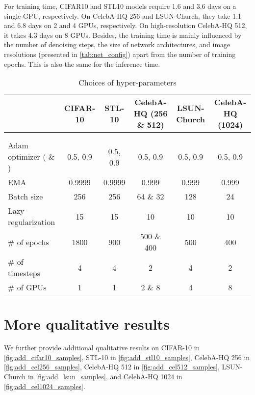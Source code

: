 \documentclass[10pt,twocolumn,letterpaper]{article}
\begin{document}
For training time, CIFAR10 and STL10 models require 1.6 and 3.6 days on a single GPU, respectively. On CelebA-HQ 256 and LSUN-Church, they take 1.1 and 6.8 days on 2 and 4 GPUs, respectively. On high-resolution CelebA-HQ 512, it takes 4.3 days on 8 GPUs. Besides, the training time is mainly influenced by the number of denoising steps, the size of network architectures, and image resolutions (presented in \cref{tab:net_config}) apart from the number of training epochs. This is also the same for the inference time.

\begin{table*}[t]
    \centering
    \begin{tabular}{l|c|c|c|c|c}
        \toprule
                                            & CIFAR-10  & STL-10    & CelebA-HQ (256 \& 512) & LSUN-Church & CelebA-HQ (1024) \\
        \midrule
                                    &   &   &       &  &    \\
                                    &  &  &       &  &     \\
        Adam optimizer ( \& ) & 0.5, 0.9  & 0.5, 0.9  & 0.5, 0.9 & 0.5, 0.9 & 0.5, 0.9  \\
        EMA                                 & 0.9999    & 0.9999    & 0.999       & 0.999 & 0.999     \\
        Batch size                          & 256       & 256       & 64 \& 32       & 128 & 24     \\
        Lazy regularization                 & 15        & 15        & 10          & 10 & 10        \\
        \# of epochs                        & 1800      & 900       & 500 \& 400     & 500 & 400     \\
        \# of timesteps                     & 4         & 4         & 2           & 4 & 2          \\
        \# of GPUs                          & 1         & 1         & 2 \& 8           & 4 & 8    \\
        \bottomrule
    \end{tabular}
    \caption{Choices of hyper-parameters}
    \label{tab:hyperparams}
\end{table*}

\section{More qualitative results} \label{apsec:qualitative}
We further provide additional qualitative results on CIFAR-10 in \cref{fig:add_cifar10_samples}, STL-10 in \cref{fig:add_stl10_samples}, CelebA-HQ 256 in \cref{fig:add_cel256_samples}, CelebA-HQ 512 in \cref{fig:add_cel512_samples}, LSUN-Church in \cref{fig:add_lsun_samples}, and CelebA-HQ 1024 in \cref{fig:add_cel1024_samples}.
\end{document}
